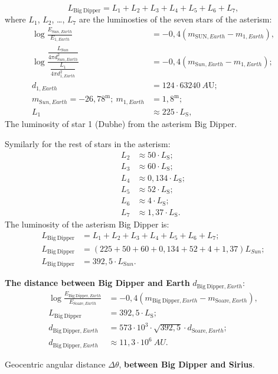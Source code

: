 \begin{description}
  \[ L_{\mathrm{Big\ Dipper}} = L_1 + L_2 + L_3 + L_4 + L_5 + L_6 + L_7, \]
  where $L_1$, $L_2$, \dots, $L_7$ are the luminosties %
  of the seven stars of the asterism:
  \begin{align*}
  \log\frac{E_{\mathrm{S}un,Earth}}{E_{1,Earth}}
    &= -0{,}4\left(m_{\mathrm{SUN},Earth} - m_{1,Earth}\right),\\
  \log\frac{\dfrac{L_{\mathrm{S}un}}{4\pi d_{\mathrm{S}un,Earth}^2}}
           {\dfrac{L_1}{4\pi d_{1,Earth}^2}}
    &= -0{,}4\left(m_{\mathrm{S}un,Earth} - m_{1,Earth}\right);\\
  d_{1,Earth} &= 124\cdot63240\ A\mathrm{U};\\
  m_{\mathrm{S}un,Earth} = -26{,}78^{\mathrm{m}};\
  m_{1,Earth} &= 1{,}8^{\mathrm{m}};\\
  L_1 &\approx 225\cdot L_{\mathrm{S}},
  \end{align*}
  The luminosity of star 1 (Dubhe) from the asterism Big Dipper.

  Symilarly for the rest of stars in the asterism: %
  \begin{align*}
  L_2 &\approx 50\cdot L_{\mathrm{S}};\\
  L_3 &\approx 60\cdot L_{\mathrm{S}};\\
  L_4 &\approx 0{,}134\cdot L_{\mathrm{S}};
  \\
  L_5 &\approx 52\cdot L_{\mathrm{S}};\\
  L_6 &\approx 4\cdot L_{\mathrm{S}};\\
  L_7 &\approx 1{,}37\cdot L_{\mathrm{S}}.
  \end{align*}
  The luminosity of the asterism Big Dipper is:
  \begin{align*}
  L_{\mathrm{Big\ Dipper}} &= L_1 + L_2 + L_3 + L_4 + L_5 + L_6 + L_7;\\
  L_{\mathrm{Big\ Dipper}} &= (225 + 50 + 60 + 0{,}134 + 52 + 4
    + 1{,}37)L_{Sun};\\
  L_{\mathrm{Big\ Dipper}} &= 392{,}5\cdot L_{\mathrm{S}un}.
  \end{align*}
\item[d)] \textbf{The distance between Big Dipper and Earth}
  $d_{\mathrm{Big\ Dipper},Earth}$:
  \begin{align*}
  \log\frac{E_{\mathrm{Big\ Dipper},Earth}}{E_{\mathrm{Soare},Earth}}
    &= -0{,}4\left(m_{\mathrm{Big\ Dipper},Earth}
       - m_{\mathrm{Soare},Earth}\right),\\
  L_{\mathrm{Big\ Dipper}} &= 392{,}5\cdot L_{\mathrm{S}};\\
  d_{\mathrm{Big\ Dipper},Earth} &= 573\cdot10^{3}\cdot\sqrt{392{,}5}
    \cdot d_{\mathrm{Soare},Earth};\\
  d_{\mathrm{Big\ Dipper},Earth} &\approx 11{,}3\cdot10^{6}\ AU.
  \end{align*}
\item[e)] Geocentric angular distance $\Delta\theta$, \textbf{between
  Big Dipper and Sirius}. %


\end{description}
